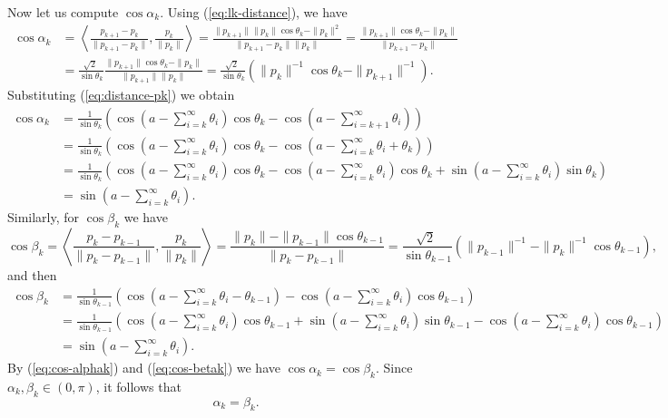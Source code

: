 \documentclass[12pt]{article}
\begin{document}
Now let us compute $\cos \alpha_k$.
Using (\ref{eq:lk-distance}), we have
$$
\begin{aligned}
  \cos \alpha_k 
& = \left\langle \frac{p_{k+1} - p_k}{\|p_{k+1} - p_k\|}, \frac{p_k}{\|p_k\|} \right\rangle 
= \frac{\|p_{k+1}\|\|p_k\| \cos \theta_k - \|p_k\|^2}{\|p_{k+1} - p_k\|\|p_k\|}
= \frac{\|p_{k+1}\| \cos \theta_k - \|p_k\|}{\|p_{k+1} - p_k\|}\\
&= \frac{\sqrt{2}\ }{\sin \theta_k} \frac{\|p_{k+1}\| \cos \theta_k - \|p_k\|}{\|p_{k+1}\| \|p_k\| } 
= \frac{\sqrt{2}\ }{\sin \theta_k} 
\left(
  \|p_{k}\|^{-1} \cos \theta_k - \|p_{k+1}\|^{-1}
\right).
\end{aligned}
$$
Substituting (\ref{eq:distance-pk}) we obtain
\begin{equation}\label{eq:cos-alphak}
\begin{aligned}
\cos \alpha_k 
&= \frac{1}{\sin \theta_k} 
\left(
  \cos\left(a- \sum_{i=k}^\infty \theta_i\right)\cos \theta_k - \cos\left(a- \sum_{i=k+1}^\infty \theta_i\right)
\right)\\
&= 
\frac{1}{\sin \theta_k} 
\left(
  \cos\left(
    a- \sum_{i=k}^\infty \theta_i
    \right)\cos \theta_k 
    - \cos\left(a- \sum_{i=k}^\infty \theta_i
    +\theta_k
    \right)
\right)\\
&= 
\frac{1}{\sin \theta_k} 
\left(
  \cos\left(
    a- \sum_{i=k}^\infty \theta_i \right)
   \cos \theta_k 
   -
   \cos\left(a- \sum_{i=k}^\infty \theta_i\right)
   \cos \theta_k 
   +
   \sin\left(
    a- \sum_{i=k}^\infty \theta_i \right) 
    \sin \theta_k
\right)\\
&= \sin\left(
  a- \sum_{i=k}^\infty \theta_i \right) 
.
\end{aligned}
\end{equation}
Similarly, for $\cos \beta_k$ we have
$$
\cos \beta_k 
= \left\langle \frac{p_{k} - p_{k-1}}{\|p_{k} - p_{k-1}\|}, \frac{p_{k}}{\|p_{k}\|} \right\rangle 
= \frac{\|p_{k}\| - \|p_{k-1}\| \cos \theta_{k-1}}{\|p_{k} - p_{k-1}\|}
=\frac{\sqrt{2}\ }{\sin \theta_{k-1}} 
\left(
  \|p_{k-1}\|^{-1} - \|p_{k}\|^{-1}\cos \theta_{k-1}
\right),
$$
and then 
\begin{equation}
\label{eq:cos-betak}
\begin{aligned}
\cos \beta_k 
&= 
\frac{1}{\sin \theta_{k-1}} 
\left(
  \cos\left(
    a- \sum_{i=k}^\infty \theta_i - \theta_{k-1}
    \right)
    - \cos\left(a- \sum_{i=k}^\infty \theta_i\right)
    \cos \theta_{k-1} 
\right)\\
&= 
\frac{1}{\sin \theta_{k-1}} 
\left(
  \cos\left(
    a- \sum_{i=k}^\infty \theta_i \right)
   \cos \theta_{k-1}
   + \sin\left(
    a- \sum_{i=k}^\infty \theta_i \right) 
    \sin \theta_{k-1}
    - 
    \cos\left(a- \sum_{i=k}^\infty \theta_i\right)
    \cos \theta_{k-1} 
\right)\\
&= \sin\left(
  a- \sum_{i=k}^\infty \theta_i \right) 
.
\end{aligned}
\end{equation}
By (\ref{eq:cos-alphak}) and (\ref{eq:cos-betak}) we have
$\cos \alpha_{k}=\cos \beta_{k}$.
Since $\alpha_k, \beta_k \in (0, \pi)$, 
it follows that
$$
\alpha_{k}=\beta_{k}.
$$
\end{document}
